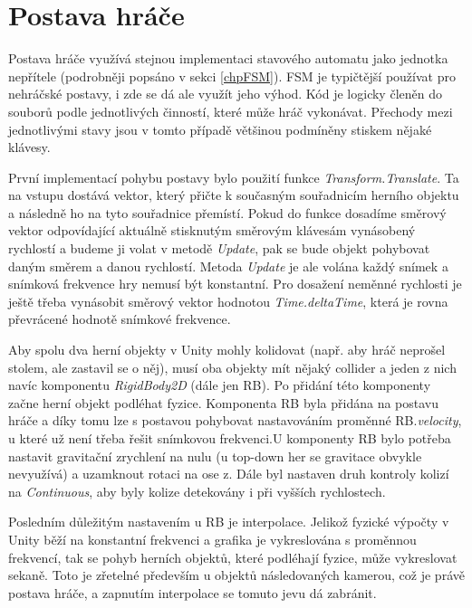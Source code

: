 \documentclass[FM,Proj]{tulthesis}
\begin{document}
	\section{Postava hráče} %
	
	Postava hráče využívá stejnou implementaci stavového automatu jako jednotka nepřítele (podrobněji popsáno v sekci \ref{chpFSM}). FSM je typičtější používat pro nehráčské postavy, i zde se dá ale využít jeho výhod. Kód je logicky členěn do souborů podle jednotlivých činností, které může hráč vykonávat. Přechody mezi jednotlivými stavy jsou v tomto případě většinou podmíněny stiskem nějaké klávesy.
	
	První implementací pohybu postavy bylo použití funkce \textit{Transform.Translate}. Ta na vstupu dostává vektor, který přičte k současným souřadnicím herního objektu a následně ho na tyto souřadnice přemístí. Pokud do funkce dosadíme směrový vektor odpovídající aktuálně stisknutým směrovým klávesám vynásobený rychlostí a budeme ji volat v metodě \textit{Update}, pak se bude objekt pohybovat daným směrem a danou rychlostí. Metoda \textit{Update} je ale volána každý snímek a snímková frekvence hry nemusí být konstantní. Pro dosažení neměnné rychlosti je ještě třeba vynásobit směrový vektor hodnotou \textit{Time.deltaTime}, která je rovna převrácené hodnotě snímkové frekvence.
	
	Aby spolu dva herní objekty v Unity mohly kolidovat (např. aby hráč neprošel stolem, ale zastavil se o něj), musí oba objekty mít nějaký collider a jeden z nich navíc komponentu \textit{RigidBody2D} (dále jen RB). Po přidání této komponenty začne herní objekt podléhat fyzice. Komponenta RB byla přidána na postavu hráče a díky tomu lze s postavou pohybovat nastavováním proměnné RB.\textit{velocity}, u které už není třeba řešit snímkovou frekvenci.U komponenty RB bylo potřeba nastavit gravitační zrychlení na nulu (u top-down her se gravitace obvykle nevyužívá) a uzamknout rotaci na ose z. Dále byl nastaven druh kontroly kolizí na \textit{Continuous}, aby byly kolize detekovány i při vyšších rychlostech.
	
	Posledním důležitým nastavením u RB je interpolace. Jelikož fyzické výpočty v Unity běží na konstantní frekvenci a grafika je vykreslována s proměnnou frekvencí, tak se pohyb herních objektů, které podléhají fyzice, může vykreslovat sekaně. Toto je zřetelné především u objektů následovaných kamerou, což je právě postava hráče, a zapnutím interpolace se tomuto jevu dá zabránit.
	\cite{UnityDocsInterpolation}
	
\end{document}
